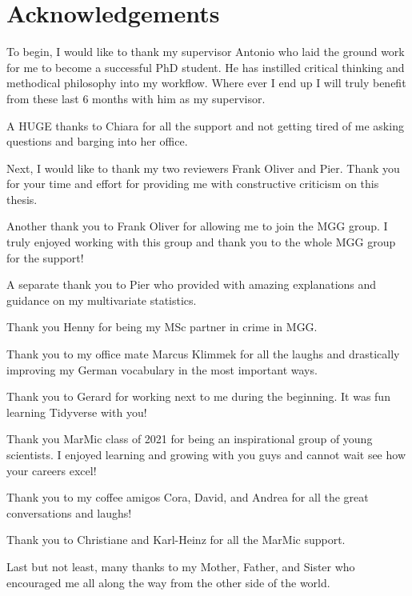 \cleardoublepage{}
\newpage
\chapter*{Acknowledgements}
\label{Acknowledgements}

\pagestyle{empty}
\fancyhead[RE]{}
\fancyhead[LO]{}

To begin, I would like to thank my supervisor Antonio who laid the ground work for me to become a successful PhD student. He has instilled critical thinking and methodical philosophy into my workflow. Where ever I end up I will truly benefit from these last 6 months with him as my supervisor.

A HUGE thanks to Chiara for all the support and not getting tired of me asking questions and barging into her office. 

Next, I would like to thank my two reviewers Frank Oliver and Pier. Thank you for your time and effort for providing me with constructive criticism on this thesis. 

Another thank you to Frank Oliver for allowing me to join the MGG group. I truly enjoyed working with this group and thank you to the whole MGG group for the support!

A separate thank you to Pier who provided with amazing explanations and guidance on my multivariate statistics. 

Thank you Henny for being my MSc partner in crime in MGG.

Thank you to my office mate Marcus Klimmek for all the laughs and drastically improving my German vocabulary in the most important ways.

Thank you to Gerard for working next to me during the beginning. It was fun learning Tidyverse with you!

Thank you MarMic class of 2021 for being an inspirational group of young scientists. I enjoyed learning and growing with you guys and cannot wait see how your careers excel!

Thank you to my coffee amigos Cora, David, and Andrea for all the great conversations and laughs!

Thank you to Christiane and Karl-Heinz for all the MarMic support.

Last but not least, many thanks to my Mother, Father, and Sister who encouraged me all along the way from the other side of the world. 